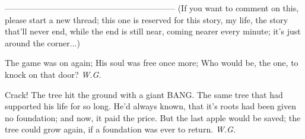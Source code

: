 --------------------------------------------------------------
(If you want to comment on this, please start a new thread; this one is reserved for this story, my life, the story that'll never end, while the end is still near, coming nearer every minute; it's just around the corner...)

The game 
was on again; 
His soul was free 
once more; 
Who would be, 
the one, 
to knock 
on that door?
\emph{W.G.}

Crack! 
The tree hit the ground 
with a giant BANG. 
The same tree 
that had supported 
his life 
for so long. 
He'd always known, 
that it's roots 
had been given no foundation; 
and now, it paid the price. 
But the last apple would be saved; 
the tree could grow again, 
if a foundation 
was ever to return. 
\emph{W.G.}

